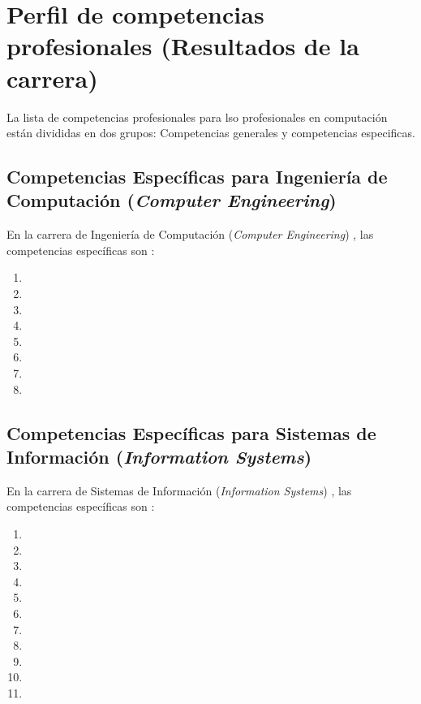\section{Perfil de competencias profesionales (Resultados de la carrera)}\label{sec:outcomes}
La lista de competencias profesionales para lso profesionales en computación están divididas en dos grupos: Competencias generales y competencias especificas.




\subsection{Competencias Específicas para Ingeniería de Computación (\textit{Computer Engineering})}
En la carrera de Ingeniería de Computación (\textit{Computer Engineering}) \cite{ComputerEngineering2004}, las competencias específicas son \cite{IEEECompetences}:
\begin{enumerate}
\renewcommand{\theenumi}{CE\arabic{enumi}}
\item {}
\item {}
\item {}
\item {}
\item {}
\item {}
\item {}
\item {}
\end{enumerate}

\subsection{Competencias Específicas para Sistemas de Información (\textit{Information Systems})}
En la carrera de Sistemas de Información (\textit{Information Systems}) \cite{InformationSystemsCurricula2010, InformationSystems2002Journal}, las competencias específicas son \cite{IEEECompetences}:
\begin{enumerate}
\renewcommand{\theenumi}{IS\arabic{enumi}}
\item {}
\item {}
\item {}
\item {}
\item {}
\item {}
\item {}
\item {}
\item {}
\item {}
\item {}
\end{enumerate}

